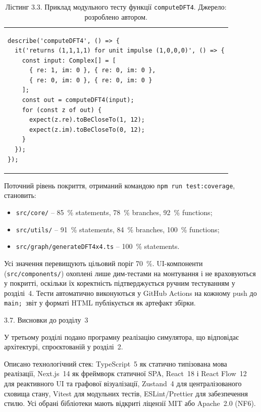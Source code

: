 \documentclass[
]{article}
\begin{document}
\begin{longtable}[]{@{}
  >{\raggedright\arraybackslash}p{}@{}}
\caption{Лістинг 3.3. Приклад модульного тесту функції
\protect\texttt{computeDFT4}. Джерело: розроблено
автором.}\tabularnewline
\toprule\noalign{}
\endfirsthead
\endhead
\bottomrule\noalign{}
\endlastfoot
\begin{minipage}[t]{\linewidth}\raggedright
\begin{verbatim}
describe('computeDFT4', () => {
  it('returns (1,1,1,1) for unit impulse (1,0,0,0)', () => {
    const input: Complex[] = [
      { re: 1, im: 0 }, { re: 0, im: 0 },
      { re: 0, im: 0 }, { re: 0, im: 0 }
    ];
    const out = computeDFT4(input);
    for (const z of out) {
      expect(z.re).toBeCloseTo(1, 12);
      expect(z.im).toBeCloseTo(0, 12);
    }
  });
});
\end{verbatim}
\end{minipage} \\
\end{longtable}

Поточний рівень покриття, отриманий командою
\texttt{npm}\texttt{\ }\texttt{run}\texttt{\ }\texttt{test:coverage},
становить:

\begin{itemize}
\item
  \texttt{src}\texttt{/}\texttt{core}\texttt{/} -- 85~\% statements,
  78~\% branches, 92~\% functions;
\item
  \texttt{src}\texttt{/}\texttt{utils}\texttt{/} -- 91~\% statements,
  84~\% branches, 100~\% functions;
\item
  \texttt{src}\texttt{/}\texttt{graph}\texttt{/generateDFT4x4.ts} --
  100~\% statements.
\end{itemize}

Усі значення перевищують цільовий поріг 70~\%. UI-компоненти
(\texttt{src}\texttt{/}\texttt{components}\texttt{/}) охоплені лише
дим-тестами на монтування і не враховуються у покритті, оскільки їх
коректність підтверджується ручним тестуванням у розділі~4. Тести
автоматично виконуються у GitHub Actions на кожному push до
\texttt{main}\texttt{;\ }звіт у форматі HTML публікується як артефакт
збірки.

\protect{}\label{_Toc229681163}{}3.7. Висновки до розділу~3

У третьому розділі подано програмну реалізацію симулятора, що відповідає
архітектурі, спроєктованій у розділі~2.

Описано технологічний стек: TypeScript~5 як статично типізована мова
реалізації, Next.js~14 як фреймворк статичної SPA, React~18 і React
Flow~12 для реактивного UI та графової візуалізації, Zustand~4 для
централізованого сховища стану, Vitest для модульних тестів,
ESLint/Prettier для забезпечення стилю. Усі обрані бібліотеки мають
відкриті ліцензії MIT або Apache~2.0 (NF6).
\end{document}
